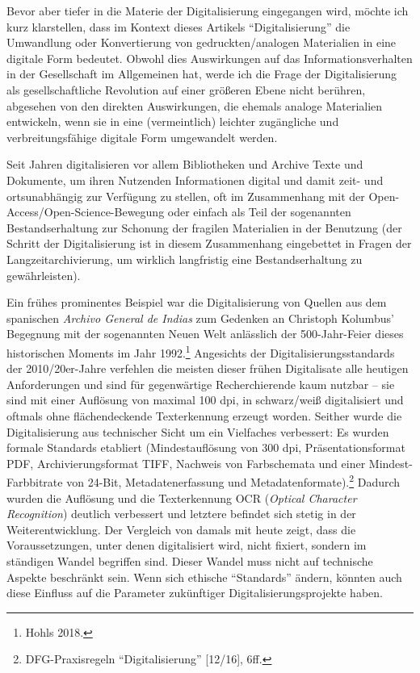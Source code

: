 \documentclass[a4paper,
fontsize=11pt,
oneside,
numbers=noperiodatend,
parskip=half-,
bibliography=totoc,
final
]{scrartcl}
\begin{document}
Bevor aber tiefer in die Materie der Digitalisierung eingegangen wird,
möchte ich kurz klarstellen, dass im Kontext dieses Artikels
\enquote{Digitalisierung} die Umwandlung oder Konvertierung von
gedruckten/analogen Materialien in eine digitale Form bedeutet. Obwohl
dies Auswirkungen auf das Informationsverhalten in der Gesellschaft im
Allgemeinen hat, werde ich die Frage der Digitalisierung als
gesellschaftliche Revolution auf einer größeren Ebene nicht berühren,
abgesehen von den direkten Auswirkungen, die ehemals analoge Materialien
entwickeln, wenn sie in eine (vermeintlich) leichter zugängliche und
verbreitungsfähige digitale Form umgewandelt werden.

Seit Jahren digitalisieren vor allem Bibliotheken und Archive Texte und
Dokumente, um ihren Nutzenden Informationen digital und damit zeit- und
ortsunabhängig zur Verfügung zu stellen, oft im Zusammenhang mit der
Open-Access/Open-Science-Bewegung oder einfach als Teil der sogenannten
Bestandserhaltung zur Schonung der fragilen Materialien in der Benutzung
(der Schritt der Digitalisierung ist in diesem Zusammenhang eingebettet
in Fragen der Langzeitarchivierung, um wirklich langfristig eine
Bestandserhaltung zu gewährleisten).

Ein frühes prominentes Beispiel war die Digitalisierung von Quellen aus
dem spanischen \emph{Archivo General de Indias} zum Gedenken an
Christoph Kolumbus' Begegnung mit der sogenannten Neuen Welt anlässlich
der 500-Jahr-Feier dieses historischen Moments im Jahr 1992.\footnote{Hohls
  2018.} Angesichts der Digitalisierungsstandards der 2010/20er-Jahre
verfehlen die meisten dieser frühen Digitalisate alle heutigen
Anforderungen und sind für gegenwärtige Recherchierende kaum nutzbar --
sie sind mit einer Auflösung von maximal 100 dpi, in schwarz/weiß
digitalisiert und oftmals ohne flächendeckende Texterkennung erzeugt
worden. Seither wurde die Digitalisierung aus technischer Sicht um ein
Vielfaches verbessert: Es wurden formale Standards etabliert
(Mindestauflösung von 300 dpi, Präsentationsformat PDF,
Archivierungsformat TIFF, Nachweis von Farbschemata und einer
Mindest-Farbbitrate von 24-Bit, Metadatenerfassung und
Metadatenformate).\footnote{DFG-Praxisregeln \enquote{Digitalisierung}
  {[}12/16{]}, 6ff.} Dadurch wurden die Auflösung und die Texterkennung
OCR (\emph{Optical Character Recognition}) deutlich verbessert und
letztere befindet sich stetig in der Weiterentwicklung. Der Vergleich
von damals mit heute zeigt, dass die Voraussetzungen, unter denen
digitalisiert wird, nicht fixiert, sondern im ständigen Wandel begriffen
sind. Dieser Wandel muss nicht auf technische Aspekte beschränkt sein.
Wenn sich ethische \enquote{Standards} ändern, könnten auch diese
Einfluss auf die Parameter zukünftiger Digitalisierungsprojekte haben.
\end{document}
